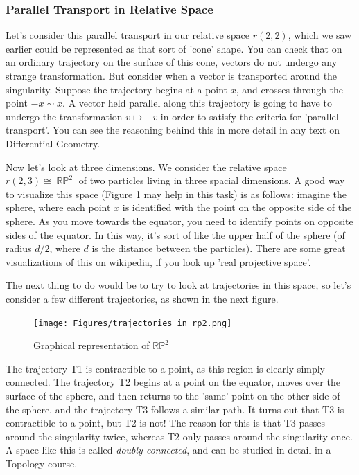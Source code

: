 \documentclass{article}
\DeclareMathOperator{\RP}{\mathbb{RP}}
\begin{document}
\subsubsection{Parallel Transport in Relative Space}
Let's consider this parallel transport in our relative space $r(2,2)$, which we saw earlier could be represented as that sort of 'cone' shape. You can check that on an ordinary trajectory on the surface of this cone, vectors do not undergo any strange transformation. But consider when a vector is transported around the singularity. Suppose the trajectory begins at a point $x$, and crosses through the point $-x \sim x$. A vector held parallel along this trajectory is going to have to undergo the transformation $v \mapsto -v$ in order to satisfy the criteria for 'parallel transport'. You can see the reasoning behind this in more detail in any text on Differential Geometry.

Now let's look at three dimensions. We consider the relative space $r(2,3) \cong \RP^2$ of two particles living in three spacial dimensions. A good way to visualize this space (Figure \ref{fig:23} may help in this task) is as follows: imagine the sphere, where each point $x$ is identified with the point on the opposite side of the sphere. As you move towards the equator, you need to identify points on opposite sides of the equator. In this way, it's sort of like the upper half of the sphere (of radius $d/2$, where $d$ is the distance between the particles). There are some great visualizations of this on wikipedia, if you look up 'real projective space'.

The next thing to do would be to try to look at trajectories in this space, so let's consider a few different trajectories, as shown in the next figure.

\begin{figure}[h]
    \centering
    \texttt{[image: Figures/trajectories\_in\_rp2.png]}
    \captionsetup{belowskip=-15pt}
    \caption{Graphical representation of $ \mathbb{RP}^2 $}
    \label{fig:23}
\end{figure}

The trajectory T1 is contractible to a point, as this region is clearly simply connected. The trajectory T2 begins at a point on the equator, moves over the surface of the sphere, and then returns to the 'same' point on the other side of the sphere, and the trajectory T3 follows a similar path. It turns out that T3 is contractible to a point, but T2 is not! The reason for this is that T3 passes around the singularity twice, whereas T2 only passes around the singularity once. A space like this is called \textit{doubly connected}, and can be studied in detail in a Topology course. 
\end{document}
